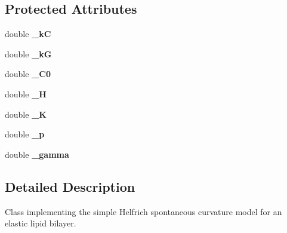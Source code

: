 \subsection*{Protected Attributes}
\begin{DoxyCompactItemize}
\item 
\hypertarget{classvoom_1_1_gauge_lipid_a2b31f953f2740c952fbec683573840e2}{
double {\bfseries \_\-kC}}
\label{classvoom_1_1_gauge_lipid_a2b31f953f2740c952fbec683573840e2}

\item 
\hypertarget{classvoom_1_1_gauge_lipid_a3951f92aa434cd3cbebb71a3ce716d8f}{
double {\bfseries \_\-kG}}
\label{classvoom_1_1_gauge_lipid_a3951f92aa434cd3cbebb71a3ce716d8f}

\item 
\hypertarget{classvoom_1_1_gauge_lipid_aee120cb26766b2a69985752ff1749f4c}{
double {\bfseries \_\-C0}}
\label{classvoom_1_1_gauge_lipid_aee120cb26766b2a69985752ff1749f4c}

\item 
\hypertarget{classvoom_1_1_gauge_lipid_a970bdd043354d56c22fcdf2dd1dee3b5}{
double {\bfseries \_\-H}}
\label{classvoom_1_1_gauge_lipid_a970bdd043354d56c22fcdf2dd1dee3b5}

\item 
\hypertarget{classvoom_1_1_gauge_lipid_af4a84ce72de2b11b522b00dbc34e5d8b}{
double {\bfseries \_\-K}}
\label{classvoom_1_1_gauge_lipid_af4a84ce72de2b11b522b00dbc34e5d8b}

\item 
\hypertarget{classvoom_1_1_gauge_lipid_a546263cf3bece35707728bcd10fab452}{
double {\bfseries \_\-p}}
\label{classvoom_1_1_gauge_lipid_a546263cf3bece35707728bcd10fab452}

\item 
\hypertarget{classvoom_1_1_gauge_lipid_a804777cf048f1b7fd6ab7e945ac04164}{
double {\bfseries \_\-gamma}}
\label{classvoom_1_1_gauge_lipid_a804777cf048f1b7fd6ab7e945ac04164}

\end{DoxyCompactItemize}


\subsection{Detailed Description}
Class implementing the simple Helfrich spontaneous curvature model for an elastic lipid bilayer. 


